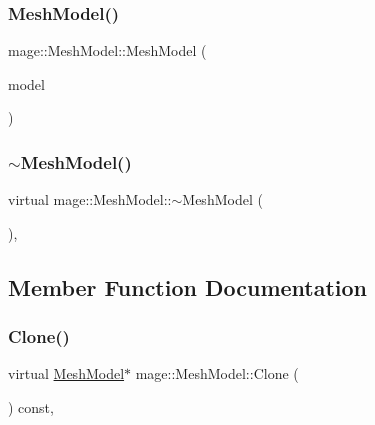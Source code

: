 \hypertarget{classmage_1_1_mesh_model_a74d2443e5d4b0f66ef981ad1312e4987}{}\label{classmage_1_1_mesh_model_a74d2443e5d4b0f66ef981ad1312e4987} 
\subsubsection{\texorpdfstring{Mesh\+Model()}{MeshModel()}\hspace{0.1cm}{\footnotesize\ttfamily [2/2]}}
{\footnotesize\ttfamily mage\+::\+Mesh\+Model\+::\+Mesh\+Model (\begin{DoxyParamCaption}\item[{const \hyperlink{classmage_1_1_mesh_model}{Mesh\+Model} \&}]{model }\end{DoxyParamCaption})}

\hypertarget{classmage_1_1_mesh_model_a5e918737b966842a31381ef6c00ca6d2}{}\label{classmage_1_1_mesh_model_a5e918737b966842a31381ef6c00ca6d2} 
\subsubsection{\texorpdfstring{$\sim$\+Mesh\+Model()}{~MeshModel()}}
{\footnotesize\ttfamily virtual mage\+::\+Mesh\+Model\+::$\sim$\+Mesh\+Model (\begin{DoxyParamCaption}{ }\end{DoxyParamCaption})\hspace{0.3cm}{\ttfamily [virtual]}, {\ttfamily [default]}}



\subsection{Member Function Documentation}
\hypertarget{classmage_1_1_mesh_model_a7130eca9a1dac038c33b838c15138161}{}\label{classmage_1_1_mesh_model_a7130eca9a1dac038c33b838c15138161} 
\subsubsection{\texorpdfstring{Clone()}{Clone()}}
{\footnotesize\ttfamily virtual \hyperlink{classmage_1_1_mesh_model}{Mesh\+Model}$\ast$ mage\+::\+Mesh\+Model\+::\+Clone (\begin{DoxyParamCaption}{ }\end{DoxyParamCaption}) const\hspace{0.3cm}{\ttfamily [override]}, {\ttfamily [virtual]}}



